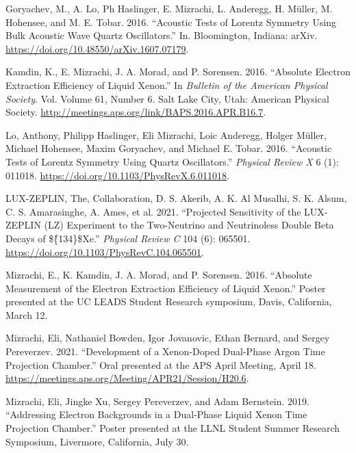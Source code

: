 \documentclass[
  10pt,
  letterpaper,
  DIV=11,
  numbers=noendperiod]{scrartcl}
\newlength{\cslhangindent}
\newlength{\cslentryspacingunit} %
\newenvironment{CSLReferences}[2] %
 {%
  \setlength{\parindent}{0pt}
  \ifodd #1
  \let\oldpar\par
  \def\par{\hangindent=\cslhangindent\oldpar}
  \fi
  \setlength{\parskip}{#2\cslentryspacingunit}
 }%
 {}
\begin{document}
\begin{CSLReferences}{1}{0}
\leavevmode{}%
Goryachev, M., A. Lo, Ph Haslinger, E. Mizrachi, L. Anderegg, H. Müller,
M. Hohensee, and M. E. Tobar. 2016. {``Acoustic Tests of {Lorentz}
Symmetry Using {Bulk Acoustic Wave} Quartz Oscillators.''} In.
{Bloomington, Indiana}: {arXiv}.
\url{https://doi.org/10.48550/arXiv.1607.07179}.

\leavevmode{}%
Kamdin, K., E. Mizrachi, J. A. Morad, and P. Sorensen. 2016. {``Absolute
{Electron Extraction Efficiency} of {Liquid Xenon}.''} In \emph{Bulletin
of the {American Physical Society}}. Vol. Volume 61, Number 6. {Salt
Lake City, Utah}: {American Physical Society}.
\url{http://meetings.aps.org/link/BAPS.2016.APR.B16.7}.

\leavevmode{}%
Lo, Anthony, Philipp Haslinger, Eli Mizrachi, Loic Anderegg, Holger
Müller, Michael Hohensee, Maxim Goryachev, and Michael E. Tobar. 2016.
{``Acoustic Tests of {Lorentz} Symmetry Using Quartz Oscillators.''}
\emph{Physical Review X} 6 (1): 011018.
\url{https://doi.org/10.1103/PhysRevX.6.011018}.

\leavevmode{}%
LUX-ZEPLIN, The, Collaboration, D. S. Akerib, A. K. Al Musalhi, S. K.
Alsum, C. S. Amarasinghe, A. Ames, et al. 2021. {``Projected Sensitivity
of the {LUX-ZEPLIN} ({LZ}) Experiment to the Two-Neutrino and
Neutrinoless Double Beta Decays of \$\{̂134\}\${Xe}.''} \emph{Physical
Review C} 104 (6): 065501.
\url{https://doi.org/10.1103/PhysRevC.104.065501}.

\leavevmode{}%
Mizrachi, E., K. Kamdin, J. A. Morad, and P. Sorensen. 2016. {``Absolute
{Measurement} of the {Electron Extraction Efficiency} of {Liquid
Xenon}.''} Poster presented at the {UC LEADS Student Research}
symposium, {Davis, California}, March 12.

\leavevmode{}%
Mizrachi, Eli, Nathaniel Bowden, Igor Jovanovic, Ethan Bernard, and
Sergey Pereverzev. 2021. {``Development of a {Xenon-Doped Dual-Phase
Argon Time Projection Chamber}.''} Oral presented at the {APS April
Meeting}, April 18.
\url{https://meetings.aps.org/Meeting/APR21/Session/H20.6}.

\leavevmode{}%
Mizrachi, Eli, Jingke Xu, Sergey Pereverzev, and Adam Bernstein. 2019.
{``Addressing {Electron Backgrounds} in a {Dual-Phase Liquid Xenon Time
Projection Chamber}.''} Poster presented at the {LLNL Student Summer
Research Symposium}, {Livermore, California}, July 30.


\end{CSLReferences}
\end{document}
